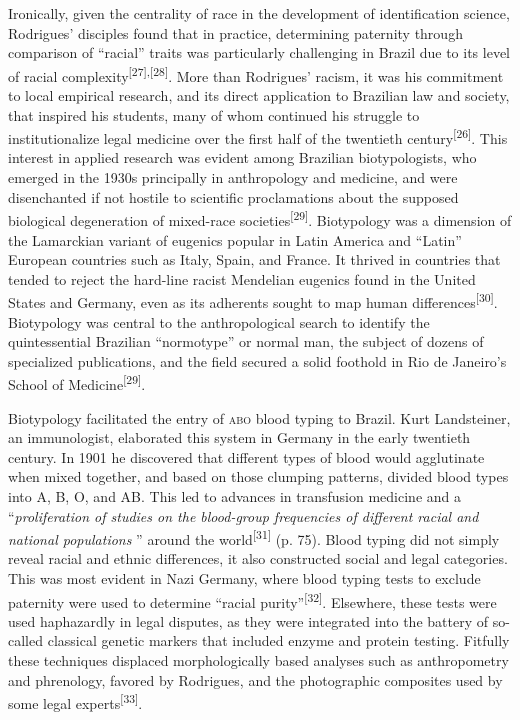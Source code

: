 \documentclass{article}
\begin{document}
Ironically, given the centrality of race in the development of identification
science, Rodrigues’ disciples found that in practice, determining paternity
through comparison of “racial” traits was particularly challenging in Brazil due
to its level of racial complexity\textsuperscript{[}\textsuperscript{27}\textsuperscript{]}\textsuperscript{,}\textsuperscript{[}\textsuperscript{28}\textsuperscript{]}. More than Rodrigues’ racism, it was his commitment to local empirical
research, and its direct application to Brazilian law and society, that inspired
his students, many of whom continued his struggle to institutionalize legal
medicine over the first half of the twentieth century\textsuperscript{[}\textsuperscript{26}\textsuperscript{]}. This interest in applied research was evident among Brazilian biotypologists,
who emerged in the 1930s principally in anthropology and medicine, and were
disenchanted if not hostile to scientific proclamations about the supposed
biological degeneration of mixed-race societies\textsuperscript{[}\textsuperscript{29}\textsuperscript{]}. Biotypology was a dimension of the Lamarckian variant of eugenics popular in
Latin America and “Latin” European countries such as Italy, Spain, and France.
It thrived in countries that tended to reject the hard-line racist Mendelian
eugenics found in the United States and Germany, even as its adherents sought to
map human differences\textsuperscript{[}\textsuperscript{30}\textsuperscript{]}. Biotypology was central to the anthropological search to identify the
quintessential Brazilian “normotype” or normal man, the subject of dozens of
specialized publications, and the field secured a solid foothold in Rio de
Janeiro’s School of Medicine\textsuperscript{[}\textsuperscript{29}\textsuperscript{]}.

Biotypology facilitated the entry of \textsc{abo} blood typing to Brazil. Kurt
Landsteiner, an immunologist, elaborated this system in Germany in the early
twentieth century. In 1901 he discovered that different types of blood would
agglutinate when mixed together, and based on those clumping patterns, divided
blood types into A, B, O, and AB. This led to advances in transfusion medicine
and a “\textit{proliferation of studies on the blood-group frequencies of
different racial and national populations}
” around the world\textsuperscript{[}\textsuperscript{31}\textsuperscript{]}
(p. 75). Blood typing did not simply reveal racial and ethnic differences, it
also constructed social and legal categories. This was most evident in Nazi
Germany, where blood typing tests to exclude paternity were used to determine
“racial purity”\textsuperscript{[}\textsuperscript{32}\textsuperscript{]}. Elsewhere, these tests were used haphazardly in legal disputes, as they were
integrated into the battery of so-called classical genetic markers that included
enzyme and protein testing. Fitfully these techniques displaced morphologically
based analyses such as anthropometry and phrenology, favored by Rodrigues, and
the photographic composites used by some legal experts\textsuperscript{[}\textsuperscript{33}\textsuperscript{]}.
\end{document}

